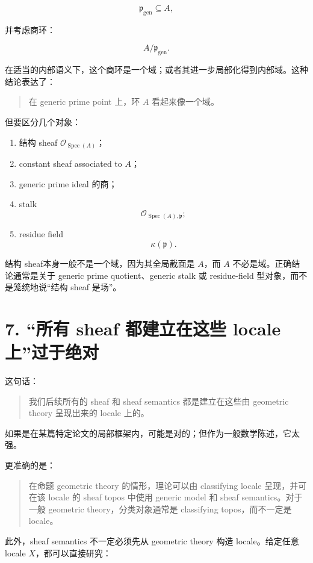 \documentclass{ctexart}
\begin{document}
\[
\mathfrak p_{\mathrm{gen}}\subseteq A,
\]

并考虑商环：

\[
A/\mathfrak p_{\mathrm{gen}}.
\]

在适当的内部语义下，这个商环是一个域；或者其进一步局部化得到内部域。这种结论表达了：

\begin{quote}
在 generic prime point 上，环 \(A\) 看起来像一个域。
\end{quote}

但要区分几个对象：

\begin{enumerate}
\item 结构 sheaf \(\mathcal O_{\operatorname{Spec}(A)}\)；
\item constant sheaf associated to \(A\)；
\item generic prime ideal 的商；
\item stalk
   \[
   \mathcal O_{\operatorname{Spec}(A),\mathfrak p};
   \]
\item residue field
   \[
   \kappa(\mathfrak p).
   \]
\end{enumerate}

结构 sheaf本身一般不是一个域，因为其全局截面是 \(A\)，而 \(A\) 不必是域。正确结论通常是关于 generic prime quotient、generic stalk 或 residue-field 型对象，而不是笼统地说``结构 sheaf 是场''。

\section*{7. ``所有 sheaf 都建立在这些 locale 上''过于绝对}

这句话：

\begin{quote}
我们后续所有的 sheaf 和 sheaf semantics 都是建立在这些由 geometric theory 呈现出来的 locale 上的。
\end{quote}

如果是在某篇特定论文的局部框架内，可能是对的；但作为一般数学陈述，它太强。

更准确的是：

\begin{quote}
在命题 geometric theory 的情形，理论可以由 classifying locale 呈现，并可在该 locale 的 sheaf topos 中使用 generic model 和 sheaf semantics。对于一般 geometric theory，分类对象通常是 classifying topos，而不一定是 locale。
\end{quote}

此外，sheaf semantics 不一定必须先从 geometric theory 构造 locale。给定任意 locale \(X\)，都可以直接研究：
\end{document}

